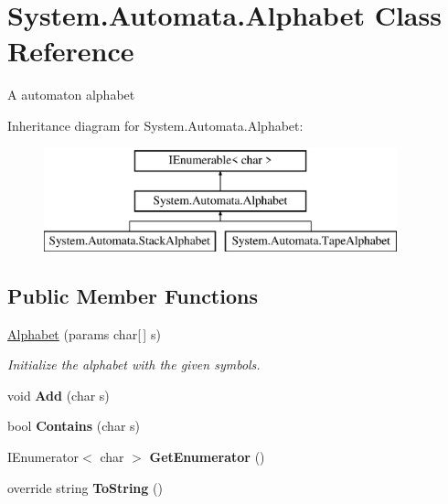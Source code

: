 \hypertarget{class_system_1_1_automata_1_1_alphabet}{}\section{System.\+Automata.\+Alphabet Class Reference}
\label{class_system_1_1_automata_1_1_alphabet}


A automaton alphabet  


Inheritance diagram for System.\+Automata.\+Alphabet\+:\begin{figure}[H]
\begin{center}
\leavevmode
\includegraphics[height=3.000000cm]{class_system_1_1_automata_1_1_alphabet}
\end{center}
\end{figure}
\subsection*{Public Member Functions}
\begin{DoxyCompactItemize}
\item 
\mbox{\hyperlink{class_system_1_1_automata_1_1_alphabet_a890f76aaecd05e71d6ad4518cdb1cbad}{Alphabet}} (params char\mbox{[}$\,$\mbox{]} s)
\begin{DoxyCompactList}\small\item\em Initialize the alphabet with the given symbols. \end{DoxyCompactList}\item 
\mbox{\label{class_system_1_1_automata_1_1_alphabet_a47207ac846122554bf2edd534027a4b6}} 
void {\bfseries Add} (char s)
\item 
\mbox{\label{class_system_1_1_automata_1_1_alphabet_a2470bf21c905aa98e1596a9365703d61}} 
bool {\bfseries Contains} (char s)
\item 
\mbox{\label{class_system_1_1_automata_1_1_alphabet_a03071782ad55452e7981cd00ae2d04e8}} 
I\+Enumerator$<$ char $>$ {\bfseries Get\+Enumerator} ()
\item 
\mbox{\label{class_system_1_1_automata_1_1_alphabet_ae17c19674243e1b67cc77590c68ae79e}} 
override string {\bfseries To\+String} ()
\end{DoxyCompactItemize}
